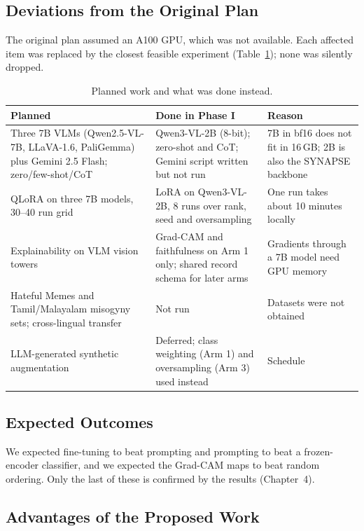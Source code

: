 \subsection{Deviations from the Original Plan}
\label{sec:deviations}

The original plan assumed an A100 GPU, which was not available. Each affected item was replaced by the closest feasible experiment (Table~\ref{tab:deviations}); none was silently dropped.

\begin{table}[h]
\centering
\caption{Planned work and what was done instead.}
\label{tab:deviations}
\small
\begin{tabular}{p{4.0cm}p{5.4cm}p{5.6cm}}
\toprule
Planned & Done in Phase I & Reason \\
\midrule
Three 7B VLMs (Qwen2.5-VL-7B, LLaVA-1.6, PaliGemma) plus Gemini 2.5 Flash; zero/few-shot/CoT & Qwen3-VL-2B (8-bit); zero-shot and CoT; Gemini script written but not run & 7B in bf16 does not fit in 16\,GB; 2B is also the SYNAPSE backbone \\
QLoRA on three 7B models, 30--40 run grid & LoRA on Qwen3-VL-2B, 8 runs over rank, seed and oversampling & One run takes about 10 minutes locally \\
Explainability on VLM vision towers & Grad-CAM and faithfulness on Arm 1 only; shared record schema for later arms & Gradients through a 7B model need GPU memory \\
Hateful Memes and Tamil/Malayalam misogyny sets; cross-lingual transfer & Not run & Datasets were not obtained \\
LLM-generated synthetic augmentation & Deferred; class weighting (Arm 1) and oversampling (Arm 3) used instead & Schedule \\
\bottomrule
\end{tabular}
\end{table}

\subsection{Expected Outcomes}

We expected fine-tuning to beat prompting and prompting to beat a frozen-encoder classifier, and we expected the Grad-CAM maps to beat random ordering. Only the last of these is confirmed by the results (Chapter~4).

\subsection{Advantages of the Proposed Work}

